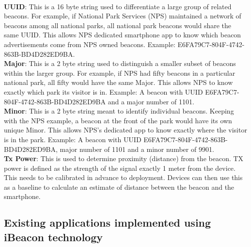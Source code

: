 \documentclass[12pt]{article}
\begin{document}
\paragraph{} 
\textbf{UUID}: This is a 16 byte string used to differentiate a large group of related beacons. For example, if National Park Services (NPS) maintained a network of beacons among all national parks, all national park beacons would share the same UUID. This allows NPS dedicated smartphone app to know which beacon advertisements come from NPS owned beacons. Example: E6FA79C7-804F-4742-863B-BD4D282ED9BA. \\

\textbf{Major}: This is a 2 byte string used to distinguish a smaller subset of beacons within the larger group. For example, if NPS had fifty beacons in a particular national park, all fifty would have the same Major. This allows NPS to know exactly which park its visitor is in. Example: A beacon with UUID E6FA79C7-804F-4742-863B-BD4D282ED9BA and a major number of 1101. \\

\textbf{Minor}: This is a 2 byte string meant to identify individual beacons. Keeping with the NPS example, a beacon at the front of the park would have its own unique Minor. This allows NPS’s dedicated app to know exactly where the visitor is in the park. Example: A beacon with UUID E6FA79C7-804F-4742-863B-BD4D282ED9BA, major number of 1101 and a minor number of 9901.\\

\textbf{Tx Power}: This is used to determine proximity (distance) from the beacon. TX power is defined as the strength of the signal exactly 1 meter from the device. This needs to be calibrated in advance to deployment. Devices can then use this as a baseline to calculate an estimate of distance between the beacon and the smartphone.  \\

\subsection{Existing applications implemented using iBeacon technology}
\end{document}
